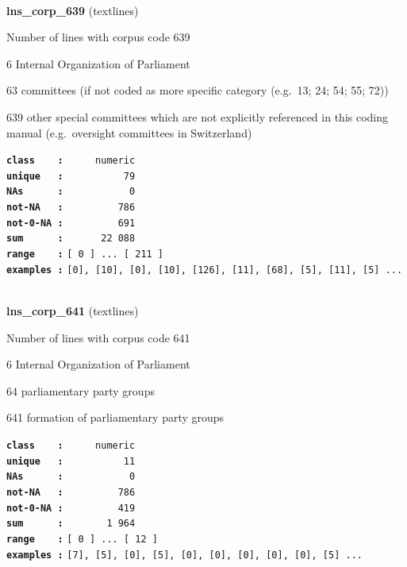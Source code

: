 \documentclass[]{article}
\begin{document}
~

\textbf{lns\_corp\_639} (textlines)

Number of lines with corpus code 639

6 Internal Organization of Parliament

63 committees (if not coded as more specific category (e.g.~13; 24; 54;
55; 72))

639 other special committees which are not explicitly referenced in this
coding manual (e.g.~oversight committees in Switzerland)

\textbf{\texttt{class\ \ \ \ :}} \texttt{~~~~~numeric}\\
\textbf{\texttt{unique\ \ \ :}} \texttt{~~~~~~~~~~79}\\
\textbf{\texttt{NAs\ \ \ \ \ \ :}} \texttt{~~~~~~~~~~~0}\\
\textbf{\texttt{not-NA\ \ \ :}} \texttt{~~~~~~~~~786}\\
\textbf{\texttt{not-0-NA\ :}} \texttt{~~~~~~~~~691}\\
\textbf{\texttt{sum\ \ \ \ \ \ :}} \texttt{~~~~~~22~088}\\
\textbf{\texttt{range\ \ \ \ :}}
\texttt{{[}\ 0\ {]}\ ...\ {[}\ 211\ {]}}\\
\textbf{\texttt{examples\ :}}
\texttt{{[}0{]},\ {[}10{]},\ {[}0{]},\ {[}10{]},\ {[}126{]},\ {[}11{]},\ {[}68{]},\ {[}5{]},\ {[}11{]},\ {[}5{]}\ ...}\\

~

\textbf{lns\_corp\_641} (textlines)

Number of lines with corpus code 641

6 Internal Organization of Parliament

64 parliamentary party groups

641 formation of parliamentary party groups

\textbf{\texttt{class\ \ \ \ :}} \texttt{~~~~~numeric}\\
\textbf{\texttt{unique\ \ \ :}} \texttt{~~~~~~~~~~11}\\
\textbf{\texttt{NAs\ \ \ \ \ \ :}} \texttt{~~~~~~~~~~~0}\\
\textbf{\texttt{not-NA\ \ \ :}} \texttt{~~~~~~~~~786}\\
\textbf{\texttt{not-0-NA\ :}} \texttt{~~~~~~~~~419}\\
\textbf{\texttt{sum\ \ \ \ \ \ :}} \texttt{~~~~~~~1~964}\\
\textbf{\texttt{range\ \ \ \ :}}
\texttt{{[}\ 0\ {]}\ ...\ {[}\ 12\ {]}}\\
\textbf{\texttt{examples\ :}}
\texttt{{[}7{]},\ {[}5{]},\ {[}0{]},\ {[}5{]},\ {[}0{]},\ {[}0{]},\ {[}0{]},\ {[}0{]},\ {[}0{]},\ {[}5{]}\ ...}\\
\end{document}
